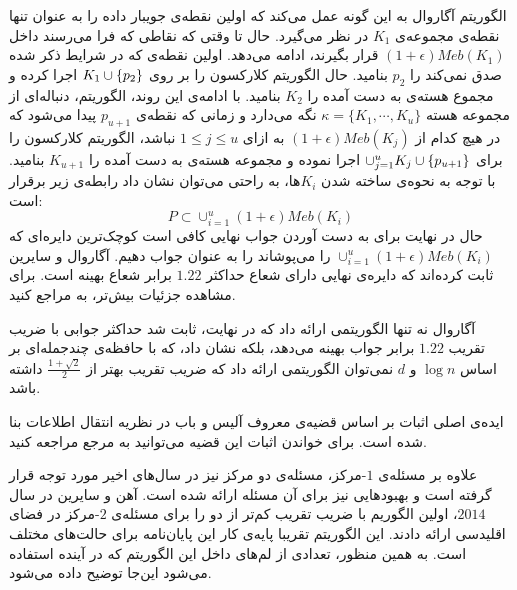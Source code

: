الگوریتم آگاروال به این گونه عمل می‌کند که اولین نقطه‌ی جویبار داده را به عنوان تنها نقطه‌ی مجموعه‌ی $K_1$ در نظر می‌گیرد. حال تا وقتی که نقاطی که فرا می‌رسند داخل $(1 + \epsilon)Meb(K_1)$ قرار بگیرند، ادامه می‌دهد. اولین نقطه‌ی که در شرایط‌ ذکر شده صدق نمی‌کند را $p_2$ بنامید. حال الگوریتم کلارکسون را بر روی $K_1 \cup \left\{ p_2 \right\}$ اجرا کرده و مجموع هسته‌ی به دست آمده را $K_2$ بنامید. با ادامه‌ی این روند، الگوریتم، دنباله‌ای از مجموعه هسته $\kappa = \{ K_1, \cdots, K_u \}$ نگه می‌دارد و زمانی که نقطه‌ی $p_{u+1}$ پیدا می‌شود که در هیچ کدام از $(1 + \epsilon)Meb(K_j)$ به ازای $1 \leq j \leq u$ نباشد، الگوریتم کلارکسون را برای $\cup_{j = 1}^{u} K_j \cup \left\{ p_{u+1} \right\}$ اجرا نموده و مجموعه هسته‌ی به دست آمده را $K_{u+1}$ بنامید. با توجه به نحوه‌ی ساخته شدن $K_i$ها، به راحتی می‌توان نشان داد رابطه‌ی زیر برقرار است:
$$P \subset \cup_{i=1}^u (1+\epsilon)Meb(K_i)$$
حال در نهایت برای به دست آوردن جواب نهایی کافی است کوچک‌ترین دایره‌ای که $\cup_{i=1}^u (1+\epsilon)Meb(K_i)$ را می‌پوشاند را به عنوان جواب دهیم. آگاروال و سایرین ثابت کرده‌اند که دایره‌ی نهایی دارای شعاع حداکثر $1.22$ برابر شعاع بهینه است. برای مشاهده‌ جزئیات بیش‌تر، به  مراجع کنید.

آگاروال نه تنها الگوریتمی ارائه داد که در نهایت، ثابت شد حداکثر جوابی با ضریب تقریب $1.22$ برابر جواب بهینه می‌دهد، بلکه نشان داد، که با حافظه‌ی چندجمله‌ای بر اساس $\log{n}$ و $d$ نمی‌توان الگوریتمی ارائه داد که ضریب تقریب بهتر از $\frac{1 + \sqrt{2}}{2}$ داشته باشد.




ایده‌ی اصلی اثبات بر اساس قضیه‌ی معروف آلیس و باب در نظریه انتقال اطلاعات بنا شده است. برای خواندن اثبات این قضیه می‌توانید به مرجع  مراجعه کنید.


علاوه بر مسئله‌ی $1$-مرکز، مسئله‌ی دو مرکز نیز در سال‌های اخیر مورد توجه قرار گرفته است و بهبود‌هایی نیز برای آن مسئله ارائه شده است. آهن و سایرین  در سال $2014$، اولین الگوریم با ضریب تقریب کم‌تر از دو را برای مسئله‌ی $2$-مرکز در فضای اقلیدسی ارائه دادند. این الگوریتم تقریبا پایه‌ی کار این پایان‌نامه برای حالت‌های مختلف است. به همین منظور، تعدادی از لم‌های داخل این الگوریتم که در آینده استفاده می‌شود این‌جا توضیح داده می‌شود.


